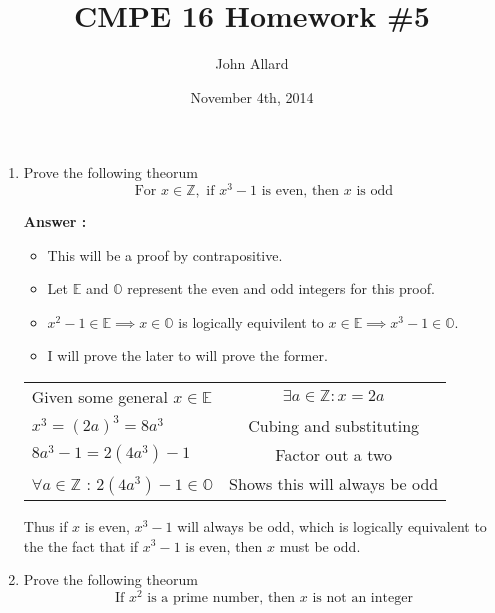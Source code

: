 \documentclass[a4paper,11pt]{article}
\title{ CMPE 16 Homework \#5}
\author{John Allard}
\date{November 4th, 2014}
\newcommand{\answer}{\textbf{Answer : }}
\begin{document}
\maketitle

\begin{enumerate}


\item Prove the following theorum \\
 \[ \text{For } x \in \mathbb{Z}, \text{ if $x^3-1$ is even, then $x$ is odd}\]

 \answer \\
 \begin{itemize}
 \item This will be a proof by contrapositive.
 \item Let $\mathbb{E}$ and $\mathbb{O}$ represent the even and odd integers for this proof. 
 \item $x^2-1 \in \mathbb{E} \implies x \in \mathbb{O}$ is logically equivilent to $x \in \mathbb{E} \implies x^3-1 \in \mathbb{O}$. 
 \item I will prove the later to will prove the former.
 \end{itemize}

 \begin{tabular}{l | c}
 Given some general $x \in \mathbb{E}$ & $\exists a \in \mathbb{Z} : x = 2a$ \\
 $x^3 = (2a)^3 = 8a^3$ & Cubing and substituting \\
 $8a^3-1 = 2(4a^3)-1$  & Factor out a two \\
 $\forall a \in \mathbb{Z}$ : $2(4a^3)-1 \in \mathbb{O}$ & Shows this will always be odd \\
 \end{tabular}

 Thus if $x$ is even, $x^3-1$ will always be odd, which is logically equivalent to the the fact that if $x^3-1$ is even, then $x$ must be odd.




 \item Prove the following theorum \\
 \[ \text{If $x^2$ is a prime number, then $x$ is not an integer}\]


\end{enumerate}
\end{document}
